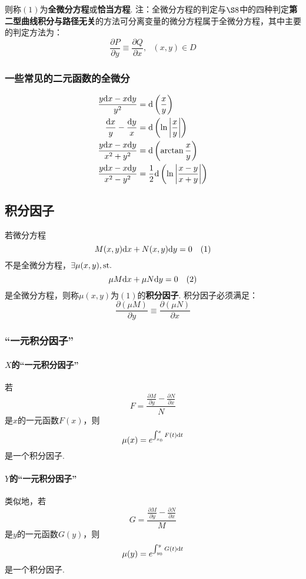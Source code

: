 \documentclass[UTF8]{ctexart}
\begin{document}
则称$(1)$为\songti\textbf{全微分方程}或\songti\textbf{恰当方程}.
注：全微分方程的判定与$\S 8$中的四种判定\textbf{第二型曲线积分与路径无关}的方法可分离变量的微分方程属于全微分方程，其中主要的判定方法为：
$$
\frac{\partial P}{\partial y}\equiv\frac{\partial Q}{\partial x},\ \ \ (x,y)\in D$$

\subsubsection{一些常见的二元函数的全微分}

$$
\begin{aligned}
\frac{y{\rm d}x-x{\rm d}y}{y^2}&={\rm d}\left(\frac xy\right)
\\\frac{{\rm d}x}{y}-\frac{{\rm d}y}{x}&={\rm d}\left(\ln\left|\frac xy\right|\right)
\\\frac{y{\rm d}x-x{\rm d}y}{x^2+y^2}&={\rm d}\left(\arctan\frac xy\right)
\\\frac{y{\rm d}x-x{\rm d}y}{x^2-y^2}&=\frac 12{\rm d}\left(\ln\left|\frac {x-y}{x+y}\right|\right)
\end{aligned}
$$

\subsection{积分因子}

若微分方程$$M(x,y){\rm d}x+N(x,y){\rm d}y=0\ \ \ (1)$$不是全微分方程，$\exists \mu(x,y),{\rm st.\ }$ $$\mu M{\rm d}x+\mu N{\rm d}y=0\ \ \ (2) $$ 是全微分方程，则称$\mu(x,y)$为$(1)$的\songti\textbf{积分因子}.
积分因子必须满足：
$$
\frac{\partial (\mu M)}{\partial y}\equiv\frac{\partial (\mu N)}{\partial x}$$

\subsubsection{“一元积分因子”}

\paragraph*{$X$的“一元积分因子”}若$$F=\frac{\displaystyle\frac{\partial M}{\partial y}-\frac{\partial N}{\partial x}}{N}$$是$x$的一元函数$F(x)$，则$$\mu(x)=e^{\int_{x_0}^xF(t){\rm d}t}$$是一个积分因子.

\paragraph*{$Y$的“一元积分因子”}类似地，若$$G=\frac{\displaystyle\frac{\partial M}{\partial y}-\frac{\partial N}{\partial x}}{M}$$是$y$的一元函数$G(y)$，则$$\mu(y)=e^{\int_{y_0}^yG(t){\rm d}t}$$是一个积分因子.
\end{document}

